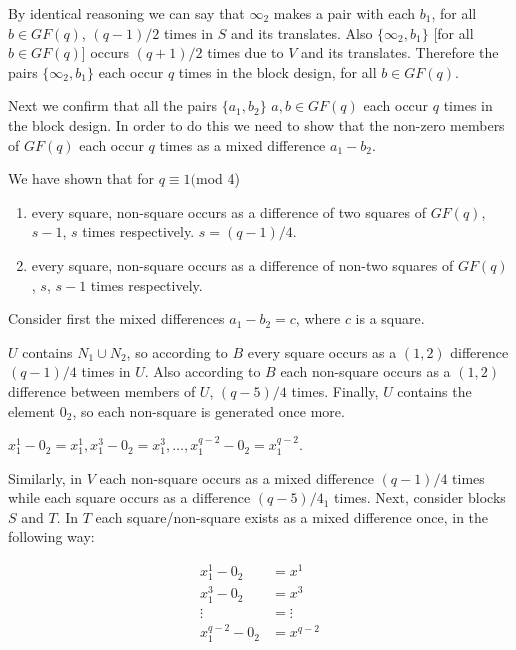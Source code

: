 \documentclass[
  11pt,
  a4paper]{book}
\begin{document}
By identical reasoning we can say that \(\infty _2\) makes a
pair with each \(b_1\), for all \(b \in GF(q)\), \((q-1)/2\) times
in \(S\) and its translates. Also \(\{\infty _2,b_1\}\) {[}for all
\(b \in GF(q)\){]} occurs \((q+1)/2\) times due to \(V\) and its
translates. Therefore the pairs \(\{\infty _2, b_1 \}\) each
occur \(q\) times in the block design, for all \(b \in GF(q)\).

Next we confirm that all the pairs
\(\{a_1,b_2\}\) \(a,b \in GF(q)\) each occur \(q\) times in the
block design. In order to do this we need to show that the
non-zero members of \(GF(q)\) each occur \(q\) times as a mixed
difference \(a_1 - b_2\).

We have shown that for \(q \equiv 1(\)mod 4)

\begin{enumerate}
\def\labelenumi{\arabic{enumi}.}
\item
  every square, non-square occurs as a difference of two
  squares of \(GF(q)\), \(s-1\), \(s\) times respectively.
  \(s = (q-1)/4\).
\item
  every square, non-square occurs as a difference of
  non-two squares of \(GF(q)\), \(s\), \(s-1\) times
  respectively.
\end{enumerate}

Consider first the mixed differences \(a_1-b_2 = c\), where
\(c\) is a square.

\(U\) contains \(N_1 \cup N_2\), so according to \(B\) every
square occurs as a \((1, 2)\) difference \((q - 1)/4\) times in
\(U\). Also according to \(B\) each non-square occurs as a \((1, 2)\)
difference between members of \(U\), \((q - 5)/4\) times.
Finally, \(U\) contains the element \(0_2\), so each non-square
is generated once more.

\(x_1^1 - 0_2 = x^1_1, x_1^3 - 0_2 = x_1^3, \ldots, x_1^{q - 2} - 0_2 = x_1^{q - 2}\).

Similarly, in \(V\) each non-square occurs as a mixed
difference \((q - 1)/4\) times while each square occurs as a
difference \((q - 5)/4_1\) times. Next, consider blocks \(S\)
and \(T\). In \(T\) each square/non-square exists as a mixed
difference once, in the following way:

\begin{align*}
  x_1^1 - 0_2   &= x^1 \\
  x_1^3 - 0_2   &= x^3 \\
      \vdots    &= \vdots \\             
  x^{q-2}_1 - 0_2   &= x^{q - 2}
\end{align*}
\end{document}
